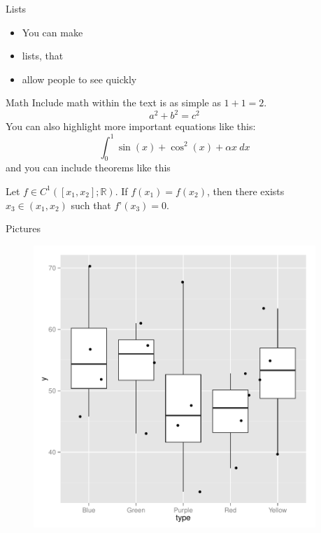 \documentclass[final,t]{beamer}
\begin{document}
\begin{frame}{}
\begin{columns}[t]
\begin{column}{0.32\linewidth}
    \end{column}%

    \begin{column}{0.32\linewidth}

      \begin{block}{Lists}
        \begin{itemize}
          \item You can make
          \item lists, that
          \item allow people to see quickly
        \end{itemize}
      \end{block}

      \begin{block}{Math}
        Include math within the text is as simple as $1+1=2$.
        \\
        \begin{equation}
          a^2 +b^2 = c^2
        \end{equation}
        You can also highlight more important equations like this:
        \begin{equation*}
          \int_0^1\sin(x)+\cos^2(x)+\alpha x~d\!x
        \end{equation*}
        and you can include theorems like this
        \begin{thm}[Rolle]
Let $f\in C^1([x_1,x_2];\mathbb{R})$. If $f(x_1)=f(x_2)$,
then there exists $x_3\in(x_1,x_2)$
such that $f’(x_3) = 0$.
        \end{thm}

      \end{block}

      \begin{block}{Pictures}
        \begin{figure}[htb]
        \includegraphics[width=.6\columnwidth]{beamerpostertest-fig1}
        \end{figure}
      \end{block}


\end{column}
\end{columns}
\end{frame}
\end{document}
